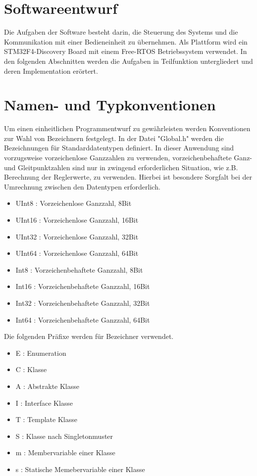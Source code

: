 \documentclass{article}
\begin{document}
\section*{Softwareentwurf}
Die Aufgaben der Software besteht darin, die Steuerung des Systems und die Kommunikation mit einer Bedieneinheit zu übernehmen. Als Plattform wird ein STM32F4-Discovery Board mit einem Free-RTOS Betriebssystem verwendet. In den folgenden Abschnitten werden die Aufgaben in Teilfunktion untergliedert und deren Implementation erörtert.

\section{Namen- und Typkonventionen}
Um einen einheitlichen Programmentwurf zu gewährleisten werden Konventionen zur Wahl von Bezeichnern festgelegt. In der Datei "Global.h"  werden die Bezeichnungen für Standarddatentypen definiert. In dieser Anwendung sind vorzugsweise vorzeichenlose Ganzzahlen zu verwenden, vorzeichenbehaftete Ganz- und Gleitpunktzahlen sind nur in zwingend erforderlichen Situation, wie z.B. Berechnung der Reglerwerte, zu verwenden. Hierbei ist besondere Sorgfalt bei der Umrechnung zwischen den Datentypen erforderlich.

\begin{itemize} 
\item UInt8 : Vorzeichenlose Ganzzahl, 8Bit
\item UInt16 : Vorzeichenlose Ganzzahl, 16Bit
\item UInt32 : Vorzeichenlose Ganzzahl, 32Bit
\item UInt64 : Vorzeichenlose Ganzzahl, 64Bit
\item Int8 	: Vorzeichenbehaftete Ganzzahl, 8Bit
\item Int16 : Vorzeichenbehaftete Ganzzahl, 16Bit
\item Int32 : Vorzeichenbehaftete Ganzzahl, 32Bit
\item Int64 : Vorzeichenbehaftete Ganzzahl, 64Bit
\end{itemize}


Die folgenden Präfixe werden für Bezeichner verwendet.

\begin{itemize}
\item E : Enumeration
\item C	: Klasse
\item A	: Abstrakte Klasse
\item I	: Interface Klasse
\item T	: Template Klasse
\item S	: Klasse nach Singletonmuster
\item m	: Membervariable einer Klasse
\item s	: Statische Memebervariable einer Klasse
\end{itemize}
\end{document}
